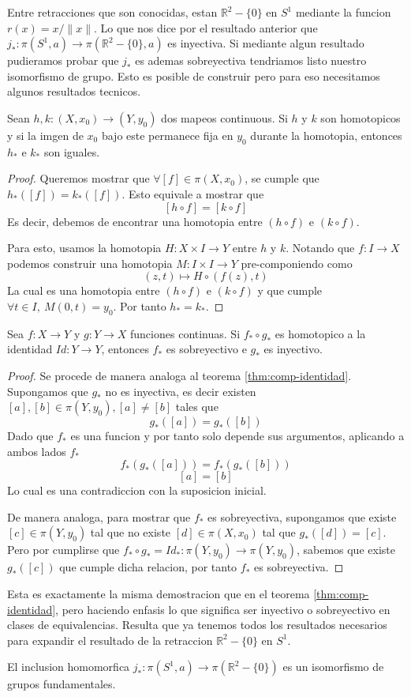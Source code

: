 Entre retracciones que son conocidas, estan \(\mathbb R ^2 - \{0\}\) en
\(S^1\) mediante la funcion \(r (x) = x / \lVert x \rVert \). Lo que nos
dice por el resultado anterior que \(j_{*} : \pi (S^1, a) \to \pi
(\mathbb R ^2 - \{0\}, a)\) es inyectiva. Si mediante algun resultado
pudieramos probar que \(j_{*}\) es ademas sobreyectiva tendriamos listo
nuestro isomorfismo de grupo. Esto es posible de construir pero para eso
necesitamos algunos resultados tecnicos.

\begin{lema}
  Sean \(h,k : (X, x_0) \to (Y, y_0)\) dos mapeos continuous. Si \(h\) y
  \(k\) son homotopicos y si la imgen de \(x_0\) bajo este permanece
  fija en \(y_0\) durante la homotopia, entonces \(h_*\) e \(k_*\) son iguales.
\end{lema}
\begin{proof}
  Queremos mostrar que \(\forall [f] \in \pi (X,x_0)\), se cumple que
  \(h_* ([f]) = k_* ([f])\). Esto equivale a mostrar que
  \[ [h \circ f] = [k \circ f] \]
  Es decir, debemos de encontrar una homotopia entre \((h \circ f)\) e \(
  (k \circ f)\).

  Para esto, usamos la homotopia \(H : X \times I \to Y \) entre \(h\) y
  \(k\). Notando que \(f : I \to X\) podemos construir una homotopia \(M
  : I \times I \to Y \) pre-componiendo como
  \[ (z, t) \mapsto H \circ (f(z), t) \]
  La cual es una homotopia entre \((h \circ f)\) e \((k \circ f)\) y que
  cumple \( \forall t \in I,\ M (0, t) = y_0\). Por tanto \(h_* = k_*\).
\end{proof}
\begin{lema}
  Sea \(f : X \to Y\) y \(g : Y \to X\) funciones continuas. Si \(f_*
  \circ g_*\) es homotopico a la identidad \( Id : Y \to Y\), entonces
  \(f_*\) es sobreyectivo e \(g_*\) es inyectivo.
\end{lema}
\begin{proof}
  Se procede de manera analoga al teorema \ref{thm:comp-identidad}.
  Supongamos que \(g_*\) no es inyectiva, es decir existen \([a],[b] \in
  \pi (Y,y_0), [a] \neq [b]\) tales que
  \[ g_* ([a]) = g_* ([b]) \]
  Dado que \(f_*\) es una funcion y por tanto solo depende sus
  argumentos, aplicando a ambos lados \(f_*\)
  \[ f_* (g_* ([a])) = f_* (g_* ([b])) \]
  \[ [a] = [b] \]
  Lo cual es una contradiccion con la suposicion inicial.

  De manera analoga, para mostrar que \(f_*\) es sobreyectiva,
  supongamos que existe \([c] \in \pi (Y, y_0)\) tal que no existe \([d]
  \in \pi (X,x_0)\) tal que \(g_* ([d]) = [c]\). Pero por cumplirse que
  \( f_* \circ g_* = Id_* : \pi (Y, y_0) \to \pi (Y, y_0)\), sabemos que
  existe \(g_* ([c])\) que cumple dicha relacion, por tanto \(f_*\) es
  sobreyectiva.
\end{proof}
Esta es exactamente la misma demostracion que en el teorema
\ref{thm:comp-identidad}, pero haciendo enfasis lo que significa ser
inyectivo o sobreyectivo en clases de equivalencias. Resulta que ya
tenemos todos los resultados necesarios para expandir el resultado de la
retraccion \(\mathbb R ^2 - \{0\}\) en \(S^1\).

\begin{teorema}
  El inclusion homomorfica \(j_* : \pi (S^1, a) \to \pi (\mathbb R ^2 -
  \{0\})\) es un isomorfismo de grupos fundamentales.
\end{teorema}